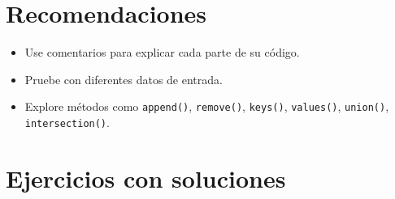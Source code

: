 \documentclass[12pt,a4paper]{article}
\begin{document}
\section*{Recomendaciones}
\begin{itemize}
    \item Use comentarios para explicar cada parte de su código.
    \item Pruebe con diferentes datos de entrada.
    \item Explore métodos como \texttt{append()}, \texttt{remove()}, \texttt{keys()}, \texttt{values()}, \texttt{union()}, \texttt{intersection()}.
\end{itemize}

\section*{Ejercicios con soluciones}
\end{document}
